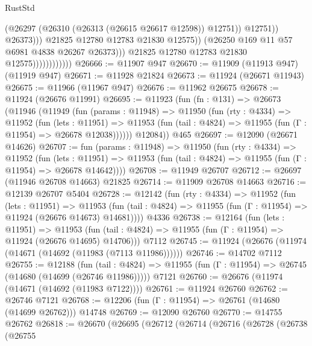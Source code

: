\begin{lexlean}{RustStd}
\begin{coremodule}
                                              (@26297
                                                (@26310 (@26313 (@26615 @26617 @12598)) @12751))
                                              @12751))
                                          @26373)))
                                    @21825
                                    @12780
                                    @12783
                                    @21830
                                    @12575))
                                (@26250 @169 @11 @57 @6981 @4838 @26267 @26373)))
                            @21825
                            @12780
                            @12783
                            @21830
                            @12575))))))))))))
@26666 := @11907 @947
@26670 := @11909 (@11913 @947) (@11919 @947)
@26671 := @11928 @21824
@26673 := @11924 (@26671 @11943)
@26675 := @11966 (@11967 @947)
@26676 := @11962 @26675
@26678 := @11924 (@26676 @11991)
@26695 := @11923
    (fun (fn : @131) =>
    @26673
      (@11946
        (@11949
          (fun (params : @11948) =>
          @11950
            (fun (rty : @4334) =>
            @11952
              (fun (lets : @11951) =>
              @11953 (fun (tail : @4824) => @11955 (fun (Γ : @11954) => @26678 @12038))))))
        @12084))
    @465
@26697 := @12090 (@26671 @14626)
@26707 := fun (params : @11948) =>
  @11950
    (fun (rty : @4334) =>
    @11952
      (fun (lets : @11951) =>
      @11953 (fun (tail : @4824) => @11955 (fun (Γ : @11954) => @26678 @14642))))
@26708 := @11949 @26707
@26712 := @26697 (@11946 @26708 @14663) @21825
@26714 := @11909 @26708 @14663
@26716 := @12139 @26707 @5404
@26728 := @12142
    (fun (rty : @4334) =>
    @11952
      (fun (lets : @11951) =>
      @11953 (fun (tail : @4824) => @11955 (fun (Γ : @11954) => @11924 (@26676 @14673) @14681))))
    @4336
@26738 := @12164
    (fun (lets : @11951) =>
    @11953 (fun (tail : @4824) => @11955 (fun (Γ : @11954) => @11924 (@26676 @14695) @14706)))
    @7112
@26745 := @11924 (@26676 (@11974 (@14671 (@14692 (@11983 (@7113 @11986))))))
@26746 := @14702 @7112
@26755 := @12188
    (fun (tail : @4824) => @11955 (fun (Γ : @11954) => @26745 (@14680 (@14699 (@26746 @11986)))))
    @7121
@26760 := @26676 (@11974 (@14671 (@14692 (@11983 @7122))))
@26761 := @11924 @26760
@26762 := @26746 @7121
@26768 := @12206 (fun (Γ : @11954) => @26761 (@14680 (@14699 @26762))) @14748
@26769 := @12090 @26760
@26770 := @14755 @26762
@26818 := @26670
    (@26695
      (@26712
        (@26714
          (@26716
            (@26728
              (@26738
                (@26755

\end{coremodule}
\end{lexlean}
